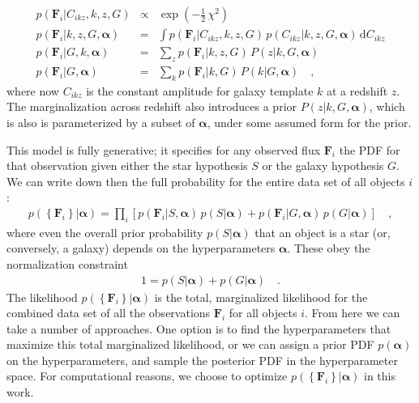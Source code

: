 \documentclass[12pt,preprint]{aastex}
\newcommand{\datavector}[1]{\boldsymbol{#1}}
\newcommand{\flux}{\datavector{F}}
\newcommand{\hyperpars}{\datavector{\alpha}}
\newcommand{\setofall}[1]{\left\{{#1}\right\}}
\newcommand{\allflux}{\setofall{\flux_i}}
\newcommand{\dd}{\mathrm{d}}
\begin{document}
\begin{eqnarray}\displaystyle
\label{eqn:galmarg}
p(\flux_i|C_{ikz},k,z,G) & \propto & \exp(-\frac{1}{2}\,\chi^2)
\nonumber\\
p(\flux_i|k,z,G,\hyperpars) & = & \int p(\flux_i|C_{ikz},k,z,G)\,p(C_{ikz}|k,z,G,
					\hyperpars)\,\dd C_{ikz}
\nonumber\\
p(\flux_i|G,k,\hyperpars) & = & \sum_z p(\flux_i|k,z,G)\,P(z|k,G,\hyperpars)
\nonumber\\
p(\flux_i|G,\hyperpars) & = & \sum_k p(\flux_i|k,G)\,P(k|G,\hyperpars)
\quad ,
\end{eqnarray}
where now $C_{ikz}$ is the constant amplitude for galaxy template $k$
at a redshift $z$.  The marginalization across redshift also introduces 
a prior $P(z|k,G,\hyperpars)$, which is also is parameterized by a subset 
of $\hyperpars$, under some assumed form for the prior.  


This model is fully generative; it specifies for any observed flux
$\flux_i$ the PDF for that observation given either the star
hypothesis $S$ or the galaxy hypothesis $G$.  We can write down then
the full probability for the entire data set of all objects $i$:
\begin{eqnarray}\displaystyle
\label{eqn:fullprob}
p(\allflux|\hyperpars) = \prod_i \left[p(\flux_i|S,\hyperpars)\,p(S|\hyperpars)
                                     + p(\flux_i|G,\hyperpars)\,p(G|\hyperpars)
                                \right]
\quad ,
\end{eqnarray}
where even the overall prior probability $p(S|\hyperpars)$ that an
object is a star (or, conversely, a galaxy) depends on the
hyperparameters $\hyperpars$.  These obey the normalization constraint
\begin{eqnarray}\displaystyle
1 = p(S|\hyperpars) + p(G|\hyperpars)
\quad .
\end{eqnarray}
The likelihood $p(\allflux|\hyperpars)$ is the total, marginalized
likelihood for the combined data set of all the observations $\flux_i$
for all objects $i$.  From here we can take a number of approaches. 
One option is to find the hyperparameters that maximize this total 
marginalized likelihood, or we can assign a prior PDF $p(\hyperpars)$ 
on the hyperparameters, and sample the posterior PDF in the 
hyperparameter space.  For computational reasons, we choose to 
optimize $p(\allflux|\hyperpars)$ in this work.
\end{document}
